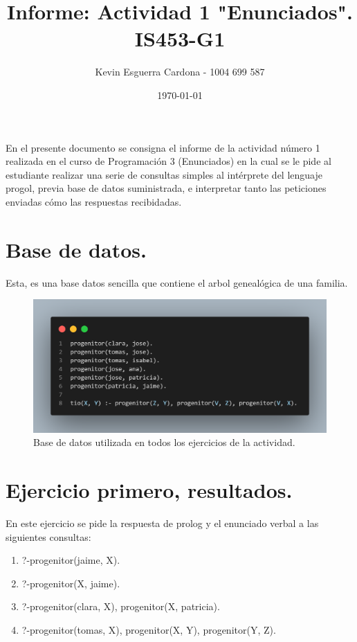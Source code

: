 \documentclass{article}
\title{Informe: Actividad 1 "Enunciados". IS453-G1}
\author{Kevin Esguerra Cardona - 1004 699 587}
\date{\today}
\begin{document}
\maketitle

En el presente documento se consigna el informe de la actividad número 1 realizada en el curso de Programación 3 (Enunciados) en la cual se le pide al estudiante
realizar una serie de consultas simples al intérprete del lenguaje progol, previa base de datos suministrada, e interpretar tanto las peticiones enviadas cómo las 
respuestas recibidadas. 

\section*{Base de datos.}
Esta, es una base datos sencilla que contiene el arbol genealógica de una familia.
\begin{figure}[h]
    \centering
    \includegraphics[width=1\textwidth]{./img/db.png}
    \caption{Base de datos utilizada en todos los ejercicios de la actividad.}
    \label{fig:db}
\end{figure}

\newpage
\section*{Ejercicio primero, resultados.}
En este ejercicio se pide la respuesta de prolog y el enunciado verbal a las siguientes consultas:
\begin{enumerate}
    \item ?-progenitor(jaime, X).
    \item ?-progenitor(X, jaime).
    \item ?-progenitor(clara, X), progenitor(X, patricia).
    \item ?-progenitor(tomas, X), progenitor(X, Y), progenitor(Y, Z).
\end{enumerate}
\end{document}
